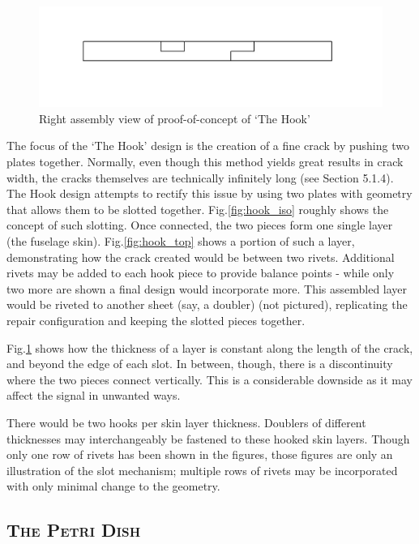 \documentclass[12pt]{article}
\begin{document}
\begin{figure}[h!]
  \centering
  	\includegraphics[width=\textwidth]{Hook_right}
  \caption{Right assembly view of proof-of-concept of `The Hook'}
  \label{fig:hook_right}
\end{figure}

The focus of the `The Hook' design is the creation of a fine crack by pushing two plates together. Normally, even though this method yields great results in crack width, the cracks themselves are technically infinitely long (see Section 5.1.4). The Hook design attempts to rectify this issue by using two plates with geometry that allows them to be slotted together. Fig.\ref{fig:hook_iso} roughly shows the concept of such slotting. Once connected, the two pieces form one single layer (the fuselage skin). Fig.\ref{fig:hook_top} shows a portion of such a layer, demonstrating how the crack created would be between two rivets. Additional rivets may be added to each hook piece to provide balance points - while only two more are shown a final design would incorporate more. This assembled layer would be riveted to another sheet (say, a doubler) (not pictured), replicating the repair configuration and keeping the slotted pieces together.

Fig.\ref{fig:hook_right} shows how the thickness of a layer is constant along the length of the crack, and beyond the edge of each slot. In between, though, there is a discontinuity where the two pieces connect vertically. This is a considerable downside as it may affect the signal in unwanted ways.

There would be two hooks per skin layer thickness. Doublers of different thicknesses may interchangeably be fastened to these hooked skin layers. Though only one row of rivets has been shown in the figures, those figures are only an illustration of the slot mechanism; multiple rows of rivets may be incorporated with only minimal change to the geometry.

\clearpage
\subsection{\textsc{The Petri Dish} }
\end{document}
